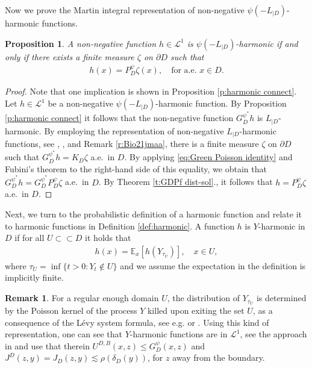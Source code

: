\documentclass[12pt,a4paper,onecolumn]{article}
\newtheorem{prop}[thm]{Proposition}
\theoremstyle{definition}
\newtheorem{rem}[thm]{Remark}
\newcommand{\ex}{\mathds{E}}
\newcommand{\subsub}{\subset\subset}
\newcommand{\1}{\mathbf 1}
\newcommand{\de}{\delta_D}
\newcommand{\calL}{\mathcal{L}^1}
\newcommand{\Lbase}{L_{|D}}
\newcommand{\Lo}{\psi(-L_{|D})}
\newcommand{\GDP}{G_D^\psi}
\newcommand{\GDPs}{G_D^{\psi^*}}
\newcommand{\PDS}{P^{\psi}_{ D}}
\numberwithin{equation}{section}
\begin{document}
	Now we prove the Martin integral representation of non-negative $\Lo$-harmonic functions.
	\begin{prop}\label{p:harm int rep}
		A non-negative function $h\in \calL$ is  $\Lo$-harmonic if and only if there exists a finite measure $\zeta$ on $\partial D$ such that 
		\begin{align*}
			h(x)=\PDS \zeta(x), \quad \text{for a.e. $x\in D$}.
		\end{align*}
	\end{prop}
	\begin{proof} Note that one implication is shown in Proposition \ref{p:harmonic connect}. Let $h\in \calL$ be a non-negative $\Lo$-harmonic function. By Proposition \ref{p:harmonic connect} it follows that the non-negative function $\GDPs h$ is $\Lbase$-harmonic. By employing the representation of non-negative $\Lbase$-harmonic functions, see \cite[Proposition 5.11 \& Theorem 3.16]{Bio21jmaa}, \cite[Eq. (4.24)]{BVW-na21}, and Remark \ref{r:Bio21jmaa}, there is a finite measure $\zeta$ on $\partial D$ such that $\GDPs h=K_D\zeta$ a.e.~in $D$. By applying \eqref{eq:Green Poisson identity} and Fubini's theorem to the right-hand side of this equality, we obtain that $\GDPs h=\GDPs\PDS\zeta$ a.e.~in $D$. By Theorem \ref{t:GDPf dist-sol}., it follows that $h=\PDS \zeta$ a.e.~in $D$.
	\end{proof}
	
	Next, we turn to the probabilistic definition of a harmonic function and relate it to harmonic functions in Definition \ref{def:harmonic}. A function $h$ is $Y$-harmonic in $D$ if for all $U\subsub D$ it holds that
	\begin{align*}
		h(x)=\ex_x[h(Y_{\tau_U})],\quad x\in U,
	\end{align*}
	where $\tau_U=\inf\{t>0:Y_t\notin U\}$ and we assume the expectation in the definition is implicitly finite. 
    \begin{rem}
       For a regular enough domain $U$, the distribution of $Y_{\tau_U}$ is determined by the Poisson kernel of the process $Y$ killed upon exiting the set $U$, as a consequence of the L\'evy system formula, see e.g. \cite[p. 1241]{ksv_minimal2016} or \cite{ikeda-watanabe}. Using this kind of representation, one can see that $Y$-harmonic functions are in $\calL$, see the approach in \cite[Eqs. (3.22) \& (3.23)]{ksv_minimal2016} and use that therein $U^{D,B}(x,z)\le \GDP(x,z)$ and $J^D(z,y)=J_D(z,y)\lesssim \rho(\de(y))$, for $z$ away from the boundary.
    \end{rem}
\end{document}
